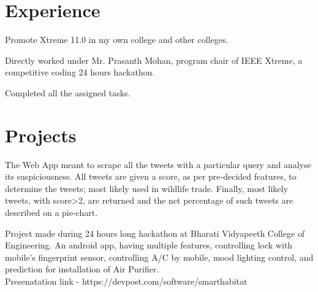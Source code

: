 \documentclass[]{deedy-resume-openfont}
\begin{document}
\begin{minipage}[t]{0.60\textwidth} 

\section{Experience }



\vspace{\topsep} %
\begin{tightemize}
\item  Promote Xtreme 11.0 in my own college and other colleges.\item Directly worked under Mr. Prasanth Mohan, program chair of IEEE Xtreme, a competitive coding 24 hours hackathon. \item Completed all the assigned tasks. %
\end{tightemize}
\sectionsep



\section{Projects}


The Web App meant to scrape all the tweets with a particular query and analyse its suspiciousness. All tweets are given a score, as per pre-decided features, to determine the tweets; most likely used in wildlife trade. Finally, most likely tweets, with score>2, are returned and the net percentage of such tweets are described on a pie-chart.
\sectionsep

Project made during 24 hours long hackathon at Bharati Vidyapeeth College of Engineering. An android app, having multiple features, controlling lock with mobile's fingerprint sensor, controlling A/C by mobile, mood lighting control, and prediction for installation of Air Purifier.\\ Presenatation link - https://devpost.com/software/smarthabitat
\sectionsep


\end{minipage}
\end{document}
